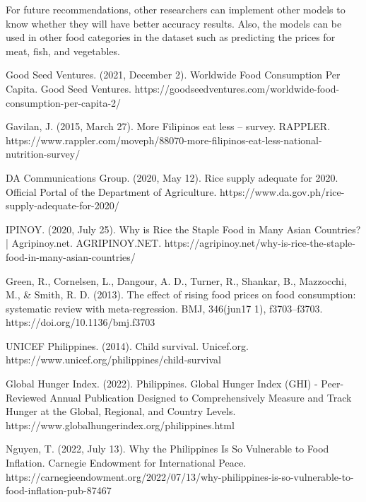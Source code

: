 \documentclass[runningheads]{llncs}
\begin{document}
For future recommendations, other researchers can implement other models to know whether they will have better accuracy results. Also, the models can be used in other food categories in the dataset such as predicting the prices for meat, fish, and vegetables. \\


%
%
%
% 
% 
%
\begin{thebibliography}{20}
	
	Good Seed Ventures. (2021, December 2). Worldwide Food Consumption Per Capita. Good Seed Ventures. https://goodseedventures.com/worldwide-food-consumption-per-capita-2/
	
	Gavilan, J. (2015, March 27). More Filipinos eat less – survey. RAPPLER. https://www.rappler.com/moveph/88070-more-filipinos-eat-less-national-nutrition-survey/
	
	
	
	DA Communications Group. (2020, May 12). Rice supply adequate for 2020. Official Portal of the Department of Agriculture. https://www.da.gov.ph/rice-supply-adequate-for-2020/
	
	IPINOY. (2020, July 25). Why is Rice the Staple Food in Many Asian Countries? | Agripinoy.net. AGRIPINOY.NET. https://agripinoy.net/why-is-rice-the-staple-food-in-many-asian-countries/
	
	Green, R., Cornelsen, L., Dangour, A. D., Turner, R., Shankar, B., Mazzocchi, M., \& Smith, R. D. (2013). The effect of rising food prices on food consumption: systematic review with meta-regression. BMJ, 346(jun17 1), f3703–f3703. https://doi.org/10.1136/bmj.f3703
	
	
UNICEF Philippines. (2014). Child survival. Unicef.org. https://www.unicef.org/philippines/child-survival
	
	
	
	Global Hunger Index. (2022). Philippines. Global Hunger Index (GHI) - Peer-Reviewed Annual Publication Designed to Comprehensively Measure and Track Hunger at the Global, Regional, and Country Levels. https://www.globalhungerindex.org/philippines.html

	
	
	Nguyen, T. (2022, July 13). Why the Philippines Is So Vulnerable to Food Inflation. Carnegie Endowment for International Peace. https://carnegieendowment.org/2022/07/13/why-philippines-is-so-vulnerable-to-food-inflation-pub-87467
	

\end{thebibliography}
\end{document}

